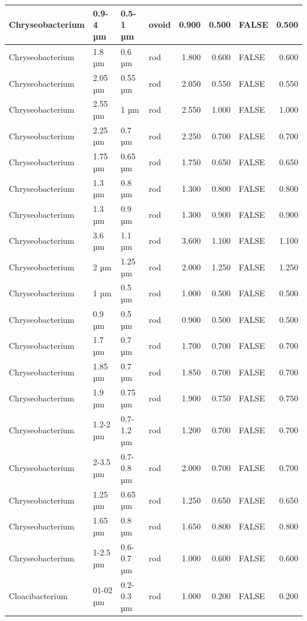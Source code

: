 \documentclass[
]{article}
\begin{document}
\begin{table}
\begin{tabular}{l|l|l|l|r|r|l|r}
\hline
Chryseobacterium & 0.9-4 µm & 0.5-1 µm & ovoid & 0.900 & 0.500 & FALSE & 0.500\\
\hline
Chryseobacterium & 1.8 µm & 0.6 µm & rod & 1.800 & 0.600 & FALSE & 0.600\\
\hline
Chryseobacterium & 2.05 µm & 0.55 µm & rod & 2.050 & 0.550 & FALSE & 0.550\\
\hline
Chryseobacterium & 2.55 µm & 1 µm & rod & 2.550 & 1.000 & FALSE & 1.000\\
\hline
Chryseobacterium & 2.25 µm & 0.7 µm & rod & 2.250 & 0.700 & FALSE & 0.700\\
\hline
Chryseobacterium & 1.75 µm & 0.65 µm & rod & 1.750 & 0.650 & FALSE & 0.650\\
\hline
Chryseobacterium & 1.3 µm & 0.8 µm & rod & 1.300 & 0.800 & FALSE & 0.800\\
\hline
Chryseobacterium & 1.3 µm & 0.9 µm & rod & 1.300 & 0.900 & FALSE & 0.900\\
\hline
Chryseobacterium & 3.6 µm & 1.1 µm & rod & 3.600 & 1.100 & FALSE & 1.100\\
\hline
Chryseobacterium & 2 µm & 1.25 µm & rod & 2.000 & 1.250 & FALSE & 1.250\\
\hline
Chryseobacterium & 1 µm & 0.5 µm & rod & 1.000 & 0.500 & FALSE & 0.500\\
\hline
Chryseobacterium & 0.9 µm & 0.5 µm & rod & 0.900 & 0.500 & FALSE & 0.500\\
\hline
Chryseobacterium & 1.7 µm & 0.7 µm & rod & 1.700 & 0.700 & FALSE & 0.700\\
\hline
Chryseobacterium & 1.85 µm & 0.7 µm & rod & 1.850 & 0.700 & FALSE & 0.700\\
\hline
Chryseobacterium & 1.9 µm & 0.75 µm & rod & 1.900 & 0.750 & FALSE & 0.750\\
\hline
Chryseobacterium & 1.2-2 µm & 0.7-1.2 µm & rod & 1.200 & 0.700 & FALSE & 0.700\\
\hline
Chryseobacterium & 2-3.5 µm & 0.7-0.8 µm & rod & 2.000 & 0.700 & FALSE & 0.700\\
\hline
Chryseobacterium & 1.25 µm & 0.65 µm & rod & 1.250 & 0.650 & FALSE & 0.650\\
\hline
Chryseobacterium & 1.65 µm & 0.8 µm & rod & 1.650 & 0.800 & FALSE & 0.800\\
\hline
Chryseobacterium & 1-2.5 µm & 0.6-0.7 µm & rod & 1.000 & 0.600 & FALSE & 0.600\\
\hline
Cloacibacterium & 01-02 µm & 0.2-0.3 µm & rod & 1.000 & 0.200 & FALSE & 0.200\\
\hline

\end{tabular}
\end{table}
\end{document}
